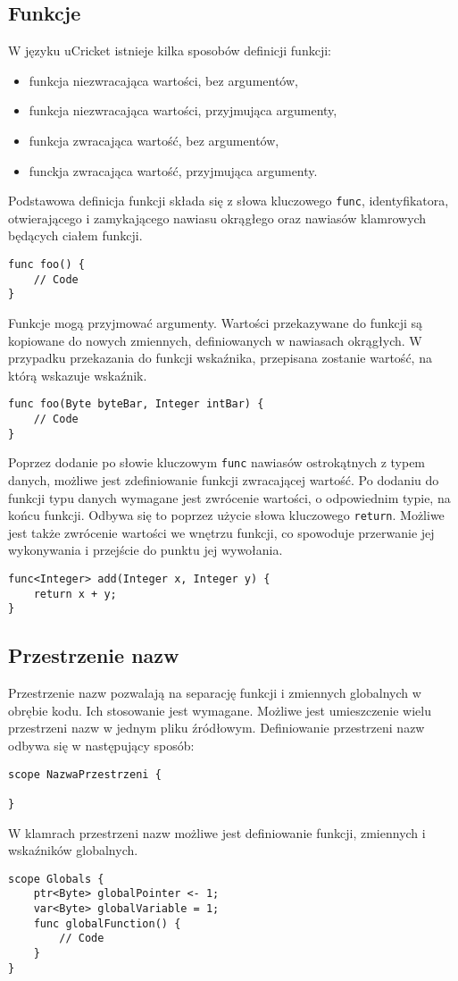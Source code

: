 \subsection{Funkcje}
W języku uCricket istnieje kilka sposobów definicji funkcji:
\begin{itemize}
\item funkcja niezwracająca wartości, bez argumentów,
\item funkcja niezwracająca wartości, przyjmująca argumenty,
\item funkcja zwracająca wartość, bez argumentów,
\item funckja zwracająca wartość, przyjmująca argumenty. 
\end{itemize}

Podstawowa definicja funkcji składa się z słowa kluczowego \lstinline|func|, identyfikatora, otwierającego i zamykającego nawiasu okrągłego oraz nawiasów klamrowych będących ciałem funkcji.
\begin{lstlisting}
func foo() {
	// Code
}
\end{lstlisting}

Funkcje mogą przyjmować argumenty. Wartości przekazywane do funkcji są kopiowane do nowych zmiennych, definiowanych w nawiasach okrągłych. W przypadku przekazania do funkcji wskaźnika, przepisana zostanie wartość, na którą wskazuje wskaźnik.
\begin{lstlisting}
func foo(Byte byteBar, Integer intBar) {
	// Code
}
\end{lstlisting}

Poprzez dodanie po słowie kluczowym \lstinline|func| nawiasów ostrokątnych z typem danych, możliwe jest zdefiniowanie funkcji zwracającej wartość. Po dodaniu do funkcji typu danych wymagane jest zwrócenie wartości, o odpowiednim typie, na końcu funkcji. Odbywa się to poprzez użycie słowa kluczowego \lstinline|return|. Możliwe jest także zwrócenie wartości we wnętrzu funkcji, co spowoduje przerwanie jej wykonywania i przejście do punktu jej wywołania.
\begin{lstlisting}
func<Integer> add(Integer x, Integer y) {
	return x + y;
}
\end{lstlisting}

\subsection{Przestrzenie nazw}
Przestrzenie nazw pozwalają na separację funkcji i zmiennych globalnych w obrębie kodu. Ich stosowanie jest wymagane. Możliwe jest umieszczenie wielu przestrzeni nazw w jednym pliku źródłowym. Definiowanie przestrzeni nazw odbywa się w następujący sposób:
\begin{lstlisting}
scope NazwaPrzestrzeni {

}
\end{lstlisting}
W klamrach przestrzeni nazw możliwe jest definiowanie funkcji, zmiennych i wskaźników globalnych. 
\begin{lstlisting}
scope Globals {
	ptr<Byte> globalPointer <- 1;
	var<Byte> globalVariable = 1;
	func globalFunction() { 
		// Code	
	}
}
\end{lstlisting}

